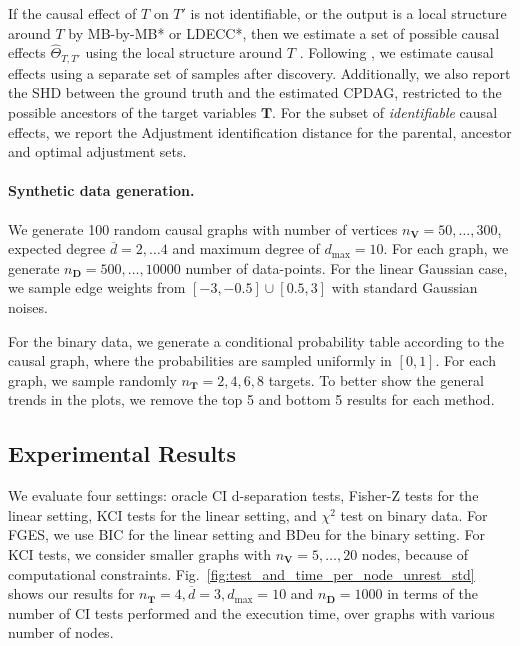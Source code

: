 If the causal effect of $T$ on $T'$ is not identifiable, or the output is a local structure around $T$ by MB-by-MB* or LDECC*, then we estimate a set of possible causal effects $\hat{\Theta}_{T, T'}$ using the local structure around $T$ \citep{maathuis2009estimating}.
Following \citet{gradu2022valid}, we estimate causal effects using a separate set of samples after discovery.
Additionally, we also report the \Ac{SHD} between the ground truth and the estimated CPDAG, restricted to the possible ancestors of the target variables $\mathbf{T}$. For the subset of \emph{identifiable} causal effects, we  report the Adjustment identification distance \citep{henckel2024adjustment} for the parental, ancestor and optimal adjustment sets.

\paragraph{Synthetic data generation.}
We generate 100 random causal graphs with number of vertices $n_\mathbf{V} = 50, \dots, 300$, expected degree $\overline{d} = 2, \dots 4$ and maximum degree of $d_{\max} = 10$. For each graph, we generate $n_{\mathbf{D}} = 500, \dots, 10000$ number of data-points. For the linear Gaussian case, we sample edge weights from $[-3, -0.5] \cup [0.5, 3]$ with standard Gaussian noises.

For the binary data, we generate a conditional probability table according to the causal graph, where the  probabilities are sampled uniformly in  $[0,1]$.
For each graph, we sample randomly $n_\mathbf{T} = 2, 4, 6, 8$ targets.
To better show the general trends in the plots, we remove the top 5 and bottom 5 results for each method.

\subsection{Experimental Results}
We evaluate four settings: oracle \ac{CI} d-separation tests, Fisher-Z tests for the linear setting, KCI tests \citep{zhang2011kernel} for the linear setting, and $\chi^2$ test on binary data. For FGES, we use BIC \citep{schwarz1978estimating} for the linear setting and BDeu \citep{heckerman1995learning} for the binary setting. For KCI tests, we consider smaller graphs with $n_\mathbf{V} =5, \dots, 20$ nodes, because of computational constraints.
Fig.~\ref{fig:test_and_time_per_node_unrest_std} shows our results for $n_{\mathbf{T}}=4, \overline{d} = 3, d_{\max}=10$ and $n_{\mathbf{D}} = 1000$ 
in terms of the number of \ac{CI} tests performed and the execution time, over graphs with various number of nodes.

